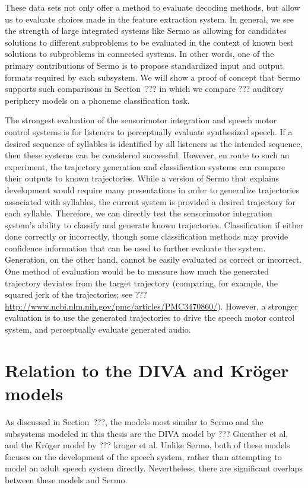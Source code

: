 These data sets not only offer a method
to evaluate decoding methods,
but allow us to evaluate choices made
in the feature extraction system.
In general, we see the strength
of large integrated systems like Sermo
as allowing for candidates solutions
to different subproblems
to be evaluated in the context of
known best solutions
to subproblems in connected systems.
In other words,
one of the primary contributions of Sermo
is to propose standardized input and output formats
required by each subsystem.
We will show a proof of concept
that Sermo supports such comparisons
in Section~??? in which we compare
??? auditory periphery models
on a phoneme classification task.

The strongest evaluation
of the sensorimotor integration
and speech motor control systems
is for listeners to perceptually evaluate
synthesized speech.
If a desired sequence of syllables
is identified by all listeners
as the intended sequence,
then these systems can be considered successful.
However, en route to such an experiment,
the trajectory generation and classification systems
can compare their outputs to known trajectories.
While a version of Sermo
that explains development
would require many presentations
in order to generalize trajectories
associated with syllables,
the current system
is provided a desired trajectory
for each syllable.
Therefore, we can directly
test the sensorimotor integration system's
ability to classify
and generate known trajectories.
Classification if either done
correctly or incorrectly,
though some classification methods
may provide confidence information
that can be used to further evaluate the system.
Generation, on the other hand,
cannot be easily evaluated
as correct or incorrect.
One method of evaluation would be to
measure how much the generated trajectory
deviates from the target trajectory
(comparing, for example,
the squared jerk of the trajectories;
see ??? \url{http://www.ncbi.nlm.nih.gov/pmc/articles/PMC3470860/}).
However, a stronger evaluation
is to use the generated trajectories
to drive the speech motor control system,
and perceptually evaluate generated audio.

\section{Relation to the DIVA and Kr\"{o}ger models}

As discussed in Section~???,
the models most similar to Sermo
and the subsystems modeled in this thesis
are the DIVA model by ??? Guenther et al,
and the Kr\"{o}ger model by ??? kroger et al.
Unlike Sermo, both of these models
focuses on the development of the speech system,
rather than attempting to model
an adult speech system directly.
Nevertheless, there are significant overlaps
between these models and Sermo.

